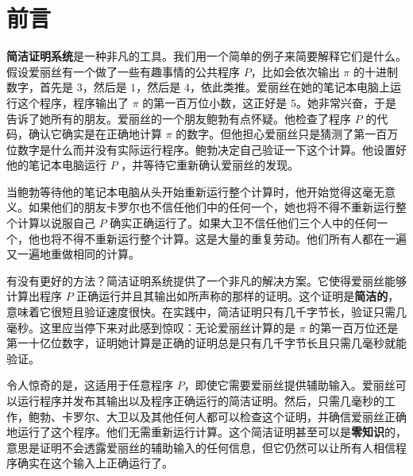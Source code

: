 \documentclass[american,singlepageview]{snargs-book-zh}
\begin{document}
\frontmatter

\maketitlepage

\thispagestyle{empty}
\vspace*{\fill}
\doclicenseThis

\cleardoublepage
\thispagestyle{plain.scrheadings}
{}
\setcounter{tocdepth}{0}
\hypersetup{bookmarksdepth=3}
\tableofcontents

\chapter{前言}
\label{section:foreword}

\textbf{简洁证明系统}是一种非凡的工具。我们用一个简单的例子来简要解释它们是什么。假设爱丽丝有一个做了一些有趣事情的公共程序 $P$，比如会依次输出 $\pi$ 的十进制数字，首先是 $3$，然后是 $1$，然后是 $4$，依此类推。爱丽丝在她的笔记本电脑上运行这个程序，程序输出了 $\pi$ 的第一百万位小数，这正好是 $5$。她非常兴奋，于是告诉了她所有的朋友。爱丽丝的一个朋友鲍勃有点怀疑。他检查了程序 $P$ 的代码，确认它确实是在正确地计算 $\pi$ 的数字。但他担心爱丽丝只是猜测了第一百万位数字是什么而并没有实际运行程序。鲍勃决定自己验证一下这个计算。他设置好他的笔记本电脑运行 $P$ ，并等待它重新确认爱丽丝的发现。

当鲍勃等待他的笔记本电脑从头开始重新运行整个计算时，他开始觉得这毫无意义。如果他们的朋友卡罗尔也不信任他们中的任何一个，她也将不得不重新运行整个计算以说服自己 $P$ 确实正确运行了。如果大卫不信任他们三个人中的任何一个，他也将不得不重新运行整个计算。这是大量的重复劳动。他们所有人都在一遍又一遍地重做相同的计算。

有没有更好的方法？简洁证明系统提供了一个非凡的解决方案。它使得爱丽丝能够计算出程序 $P$ 正确运行并且其输出如所声称的那样的证明。这个证明是\textbf{简洁的}，意味着它很短且验证速度很快。在实践中，简洁证明只有几千字节长，验证只需几毫秒。这里应当停下来对此感到惊叹：无论爱丽丝计算的是 $\pi$ 的第一百万位还是第一十亿位数字，证明她计算是正确的证明总是只有几千字节长且只需几毫秒就能验证。

令人惊奇的是，这适用于任意程序 $P$，即使它需要爱丽丝提供辅助输入。爱丽丝可以运行程序并发布其输出以及程序正确运行的简洁证明。然后，只需几毫秒的工作，鲍勃、卡罗尔、大卫以及其他任何人都可以检查这个证明，并确信爱丽丝正确地运行了这个程序。他们无需重新运行计算。这个简洁证明甚至可以是\textbf{零知识}的，意思是证明不会透露爱丽丝的辅助输入的任何信息，但它仍然可以让所有人相信程序确实在这个输入上正确运行了。
\end{document}
